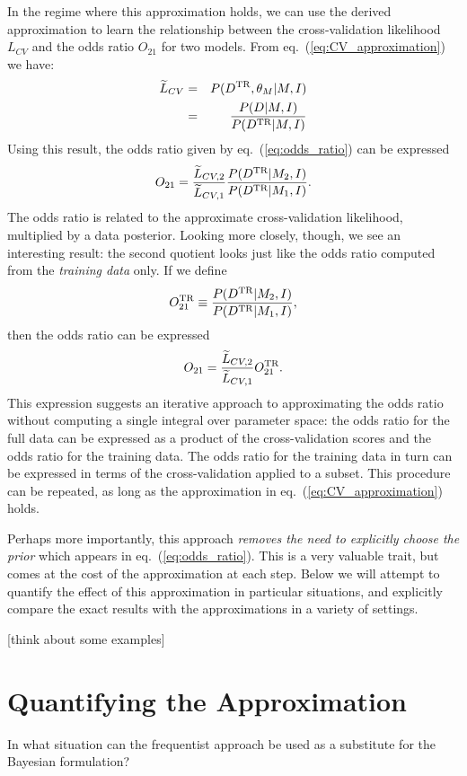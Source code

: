 \documentclass[12pt]{article}
\newcommand{\Dtr}{\ensuremath{D^{\rm TR}}}
\newcommand{\eqn}[1]{eq.~(\ref{eq:#1})}
\begin{document}
In the regime where this approximation holds, we can use the derived
approximation to learn the relationship between the cross-validation
likelihood $L_{CV}$ and the odds ratio $O_{21}$ for two models.  From
\eqn{CV_approximation} we have:
\begin{eqnarray}
  \widetilde{L}_{CV} &=& P(\Dtr,\theta_M|M,I)\nonumber\\
                    &=& \frac{P(D|M, I)}{P(\Dtr|M, I)}
\end{eqnarray}
Using this result, the odds ratio given by \eqn{odds_ratio} can be expressed
\begin{equation}
  O_{21} = \frac{\widetilde{L}_{CV,2}}{\widetilde{L}_{CV,1}}
          \frac{P(\Dtr|M_2,I)}{P(\Dtr|M_1,I)}.
\end{equation}
The odds ratio is related to the approximate cross-validation likelihood,
multiplied by a data posterior.  Looking more closely, though, we see
an interesting result: the second quotient looks just like the odds
ratio computed from the {\it training data} only.  If we define
\begin{equation}
  O_{21}^{\rm TR} \equiv  \frac{P(\Dtr|M_2,I)}{P(\Dtr|M_1,I)},
\end{equation}
then the odds ratio can be expressed
\begin{equation}
  O_{21} = \frac{\widetilde{L}_{CV,2}}{\widetilde{L}_{CV,1}} O_{21}^{\rm TR}.
\end{equation}
This expression suggests an iterative approach to approximating the odds
ratio without computing a single integral over parameter space:
the odds ratio for the full data can be expressed as a product of the
cross-validation scores and the odds ratio for the training data. The
odds ratio for the training data in turn can be expressed in terms of
the cross-validation applied to a subset.  This procedure can be repeated,
as long as the approximation in \eqn{CV_approximation} holds.

Perhaps more importantly, this approach {\it removes the need to explicitly
choose the prior} which appears in \eqn{odds_ratio}.  This is a very valuable
trait, but comes at the cost of the approximation at each step.  Below we
will attempt to quantify the effect of this approximation in particular
situations, and explicitly compare the exact results with the approximations
in a variety of settings.

[think about some examples]

\section{Quantifying the Approximation}
In what situation can the frequentist approach be used as a substitute for
the Bayesian formulation?
\end{document}
